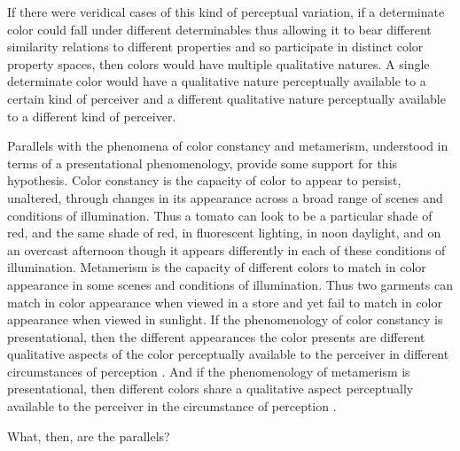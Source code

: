 \documentclass[12pt]{article}
\begin{document}
If there were veridical cases of this kind of perceptual variation, if a determinate color could fall under different determinables thus allowing it to bear different similarity relations to different properties and so participate in distinct color property spaces, then colors would have multiple qualitative natures. A single determinate color would have a qualitative nature perceptually available to a certain kind of perceiver and a different qualitative nature perceptually available to a different kind of perceiver. 

Parallels with the phenomena of color constancy and metamerism, understood in terms of a presentational phenomenology, provide some support for this hypothesis. Color constancy is the capacity of color to appear to persist, unaltered, through changes in its appearance across a broad range of scenes and conditions of illumination. Thus a tomato can look to be a particular shade of red, and the same shade of red, in fluorescent lighting, in noon daylight, and on an overcast afternoon though it appears differently in each of these conditions of illumination. Metamerism is the capacity of different colors to match in color appearance in some scenes and conditions of illumination. Thus two garments can match in color appearance when viewed in a store and yet fail to match in color appearance when viewed in sunlight. If the phenomenology of color constancy is presentational, then the different appearances the color presents are different qualitative aspects of the color perceptually available to the perceiver in different circumstances of perception \citep[see][for a defense of this]{Hilbert:2007qy,Kalderon:2006fk}. And if the phenomenology of metamerism is presentational, then different colors share a qualitative aspect perceptually available to the perceiver in the circumstance of perception \citep[see][for a defense of this]{Kalderon:2006fk}.

What, then, are the parallels?
\end{document}
